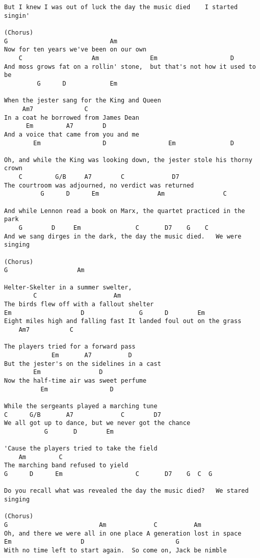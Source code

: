 \begin{verbatim}
But I knew I was out of luck the day the music died    I started singin' 

(Chorus) 
G                            Am 
Now for ten years we've been on our own  
    C                   Am              Em                    D 
And moss grows fat on a rollin' stone,  but that's not how it used to be 
         G      D            Em 

When the jester sang for the King and Queen 
     Am7              C 
In a coat he borrowed from James Dean  
      Em         A7        D 
And a voice that came from you and me 
        Em                 D                 Em               D 

Oh, and while the King was looking down, the jester stole his thorny crown 
    C         G/B     A7        C             D7 
The courtroom was adjourned, no verdict was returned 
          G      D      Em                Am                C 

And while Lennon read a book on Marx, the quartet practiced in the park 
    G        D     Em               C       D7    G    C 
And we sang dirges in the dark, the day the music died.   We were singing 

(Chorus) 
G                   Am 

Helter-Skelter in a summer swelter,  
        C                     Am 
The birds flew off with a fallout shelter 
Em                   D               G      D        Em 
Eight miles high and falling fast It landed foul out on the grass 
    Am7           C 

The players tried for a forward pass  
             Em       A7          D 
But the jester's on the sidelines in a cast 
        Em                D 
Now the half-time air was sweet perfume  
          Em                 D 

While the sergeants played a marching tune 
C      G/B       A7             C        D7 
We all got up to dance, but we never got the chance 
           G       D        Em              

'Cause the players tried to take the field  
    Am         C 
The marching band refused to yield 
G      D      Em                    C       D7    G  C  G 

Do you recall what was revealed the day the music died?   We stared singing 

(Chorus) 
G                         Am             C          Am 
Oh, and there we were all in one place A generation lost in space 
Em                   D                         G 
With no time left to start again.  So come on, Jack be nimble 


\end{verbatim}
